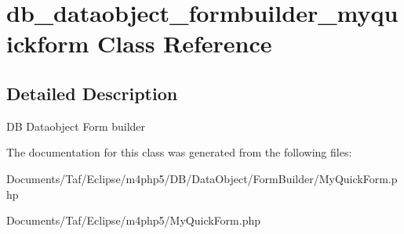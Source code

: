 \hypertarget{classdb__dataobject__formbuilder__myquickform}{
\section{db\_\-dataobject\_\-formbuilder\_\-myquickform Class Reference}
\label{classdb__dataobject__formbuilder__myquickform}
}


\subsection{Detailed Description}
DB Dataobject Form builder 

The documentation for this class was generated from the following files:\begin{CompactItemize}
\item 
Documents/Taf/Eclipse/m4php5/DB/DataObject/FormBuilder/MyQuickForm.php\item 
Documents/Taf/Eclipse/m4php5/MyQuickForm.php\end{CompactItemize}
